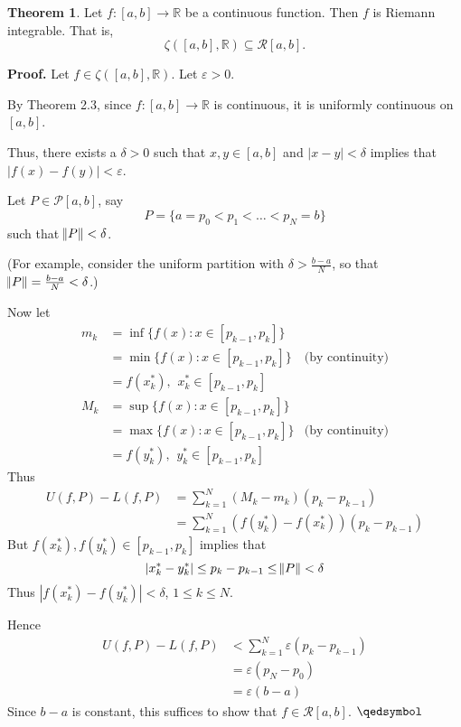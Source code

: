 \documentclass[11pt]{article}
\theoremstyle{definition}
\newtheorem{thm}{Theorem}[section]
\newcommand{\mbR}{\ensuremath{\mathbb{R}}}
\begin{document}
\begin{thm}
Let $f : [a, b] \to \mbR$ be a continuous function. Then $f$ is Riemann integrable. That is,
$$\zeta([a, b], \mbR) \subseteq \mathcal{R}[a, b] \text{.}$$
\end{thm}
\textbf{Proof.} Let $f \in \zeta([a, b], \mbR)$. Let $\varepsilon > 0$. 

By Theorem 2.3, since $f : [a, b] \to \mbR$ is continuous, it is uniformly continuous on $[a, b]$. 

Thus, there exists a $\delta > 0$ such that $x, y \in [a, b]$ and $|x - y| < \delta$ implies that $|f(x) - f(y)| < \varepsilon$. 

Let $P \in \mathcal{P}[a, b]$, say
$$P = \{a = p_0 < p_1 < \dots < p_N = b\}$$
such that $\norm{P} < \delta$. 

(For example, consider the uniform partition with $\delta > \frac{b-a}N$, so that $\norm{P} = \frac{b-a}N < \delta$.) 

Now let
\begin{align*}
m_k & = \inf \{f(x) : x \in [p_{k-1}, p_k]\} \\
& = \min \{f(x) : x \in [p_{k-1}, p_k]\} & \text{(by continuity)} \\
& = f(x_k^*), \hspace{5pt} x_k^* \in [p_{k-1}, p_k] \\
M_k & = \sup \{f(x) : x \in [p_{k-1}, p_k]\} \\
& = \max \{f(x) : x \in [p_{k-1}, p_k]\} & \text{(by continuity)} \\
& = f(y_k^*), \hspace{5pt} y_k^* \in [p_{k-1}, p_k]
\end{align*}
Thus
\begin{align*}
U(f, P) - L(f, P) & = \sum_{k=1}^N (M_k - m_k)(p_k - p_{k-1}) \\
& = \sum_{k=1}^N \left(f(y_k^*) - f(x_k^*)\right)(p_k - p_{k-1}) 
\end{align*}
But $f(x_k^*), f(y_k^*) \in [p_{k-1}, p_k]$ implies that
$$|x_k^* - y_k^*| \leq p_k - p_{k-1} \leq \norm{P} < \delta$$
Thus $|f(x_k^*) - f(y_k^*)| < \delta$, $1 \leq k \leq N$. 

Hence
\begin{align*}
U(f, P) - L(f, P) & < \sum_{k=1}^N \varepsilon(p_k - p_{k-1}) \\
& = \varepsilon(p_N - p_0) \\
& = \varepsilon(b-a)
\end{align*}
Since $b-a$ is constant, this suffices to show that $f \in \mathcal{R}[a, b]$. $\qedsymbol$
\end{document}
